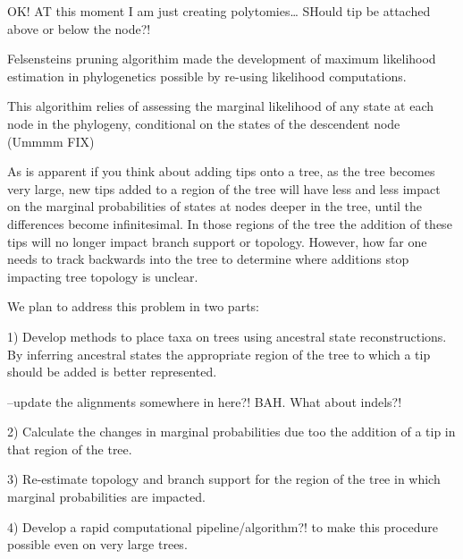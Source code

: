 OK! AT this moment I am just creating polytomies… SHould tip be attached above or below the node?!




Felsensteins pruning algorithim made the development of maximum likelihood estimation in phylogenetics possible by re-using likelihood computations.

This algorithim relies of assessing the marginal likelihood of any state at each node in the phylogeny, conditional on the states of the descendent node (Ummmm FIX)

As is apparent if you think about adding tips onto a tree, as the tree becomes very large, new tips added to a region of the tree will have less and less impact on the marginal probabilities of states at nodes deeper in the tree, until the differences become infinitesimal. In those regions of the tree the addition of these tips will no longer impact branch support or topology. However, how far one needs to track backwards into the tree to determine where additions stop impacting tree topology is unclear.

We plan to address this problem in two parts:

1) Develop methods to place taxa on trees using ancestral state reconstructions. By inferring ancestral states the appropriate region of the tree to which a tip should be added is better represented.

--update the alignments somewhere in here?! BAH. What about indels?!

2) Calculate the changes in marginal probabilities due too the addition of a tip in that region of the tree.

3) Re-estimate topology and branch support for the region of the tree in which marginal probabilities are impacted.

4) Develop a rapid computational pipeline/algorithm?! to make this procedure possible even on very large trees.
